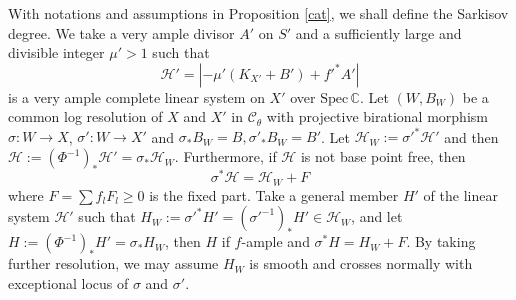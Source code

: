 \documentclass[11pt]{amsart}
\numberwithin{equation}{section}
\begin{document}
With notations and assumptions in Proposition \ref{cat},   we shall define the Sarkisov degree. We take a  very ample divisor $ A'  $ on $ S' $ and a sufficiently large and divisible integer $ \mu'>1 $ such that 
\[ \mathcal{H}'=|-\mu' (K_{X'}+B') +f'^*A'| \]
is a very ample complete linear system on $ X' $ over $ \mathrm{Spec}\,\mathbb{C} $. Let $ (W,B_W) $ be a common log resolution of $ X $ and $ X' $ in $ \mathcal{C}_\theta $ with projective birational morphism $ \sigma:W\to X$,   $\sigma':W\to X' $ and $\sigma_*B_W=B, \sigma'_*B_W=B' $. Let $\mathcal{H}_W:=\sigma'^*\mathcal{H}'$
and then $\mathcal{H}:=(\Phi^{-1})_*\mathcal{H}'=\sigma_*\mathcal{H}_W$. Furthermore, if $ \mathcal{H} $ is not base point free, then
\[ \sigma^*\mathcal{H}=\mathcal{H}_W+F \]
where $ F=\sum f_lF_l\geqslant0 $ is the fixed part. Take a general member $ H' $ of the linear system $ \mathcal{H}' $ such that $ H_W:=\sigma'^*H'=(\sigma'^{-1})_*H'\in \mathcal{H}_W $, and let $ H:=(\Phi^{-1})_*H'=\sigma_*H_{W} $, then $H$ if $f$-ample and $ \sigma^*H=H_W+F $. By taking further resolution, we may assume $H_{W}$ is smooth and crosses normally with exceptional locus of $\sigma$ and $\sigma'$.

\end{document}
